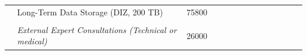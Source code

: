\begin{table}[]
\begin{tabular}{llllrrrrcrrrrrr}
\rowcolor[HTML]{C6D9F1} 
\textbf{}                                                & Long-Term Data Storage (DIZ, 200 TB)                          & \multicolumn{1}{r}{\cellcolor[HTML]{C6D9F1}}    & \multicolumn{1}{r}{\cellcolor[HTML]{C6D9F1}75800} &                                                       & \multicolumn{1}{l}{\cellcolor[HTML]{C6D9F1}}          & \multicolumn{1}{l}{\cellcolor[HTML]{C6D9F1}}          & \multicolumn{1}{l}{\cellcolor[HTML]{C6D9F1}}          & \multicolumn{1}{l}{\cellcolor[HTML]{C6D9F1}}          & \multicolumn{1}{l}{\cellcolor[HTML]{C6D9F1}}                   & \multicolumn{1}{l}{\cellcolor[HTML]{C6D9F1}}                   & \multicolumn{1}{l}{\cellcolor[HTML]{C6D9F1}}          & \multicolumn{1}{l}{\cellcolor[HTML]{C6D9F1}}          & \multicolumn{1}{l}{\cellcolor[HTML]{92D050}\textbf{}}             & \multicolumn{1}{l}{\cellcolor[HTML]{92D050}\textbf{}}          \\
\rowcolor[HTML]{B9CDE5} 
\textbf{}                                                &                                                               & \multicolumn{1}{r}{\cellcolor[HTML]{B9CDE5}}    &                                                   & \multicolumn{1}{l}{\cellcolor[HTML]{B9CDE5}}          & \multicolumn{1}{l}{\cellcolor[HTML]{B9CDE5}}          & \multicolumn{1}{l}{\cellcolor[HTML]{B9CDE5}}          & \multicolumn{1}{l}{\cellcolor[HTML]{B9CDE5}}          & \multicolumn{1}{l}{\cellcolor[HTML]{B9CDE5}}          & \multicolumn{1}{l}{\cellcolor[HTML]{C6D9F1}\textbf{}}          & \multicolumn{1}{l}{\cellcolor[HTML]{C6D9F1}\textbf{}}          & \multicolumn{1}{l}{\cellcolor[HTML]{C6D9F1}}          & \multicolumn{1}{l}{\cellcolor[HTML]{C6D9F1}}          & \multicolumn{1}{l}{\cellcolor[HTML]{92D050}\textbf{}}             & \multicolumn{1}{l}{\cellcolor[HTML]{92D050}\textit{\textbf{}}} \\
                                                         & \multicolumn{2}{l}{\cellcolor[HTML]{FFFF99}\textit{External Expert Consultations (Technical or medical)}}       & \multicolumn{1}{r}{\cellcolor[HTML]{FFFF99}26000} & \cellcolor[HTML]{FFFF99}                              & \multicolumn{1}{l}{\cellcolor[HTML]{FFFF99}\textit{}} & \multicolumn{1}{c}{\textit{}}                         & \multicolumn{1}{l}{\textit{}}                         & \cellcolor[HTML]{FFFF99}\textit{}                     & \multicolumn{1}{l}{\cellcolor[HTML]{92D050}\textit{\textbf{}}} & \multicolumn{1}{c}{}                                           & \multicolumn{1}{l}{\cellcolor[HTML]{92D050}\textit{}} & \multicolumn{1}{l}{\cellcolor[HTML]{FFFF99}\textit{}} & \multicolumn{1}{l}{\cellcolor[HTML]{BFBFBF}\textit{\textbf{}}}    & \multicolumn{1}{l}{\textit{\textbf{}}}                         \\

\end{tabular}
\end{table}
